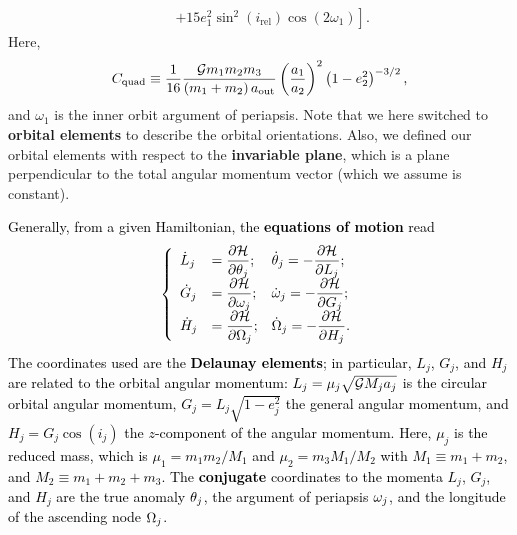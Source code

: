 \documentclass[main.tex]{subfiles}
\begin{document}
\begin{tcolorbox}[sharp corners, colback=green!30, colframe=green!80!blue, title=Box \refstepcounter{educhap3}\label{boxchap3:dynVI}\ref{boxchap3:dynVI} -- Orbital dynamics VI]
{\begin{align}
&\quad \left. + 15 e_1^2 \sin^2(i_\mathrm{rel}) \cos(2\omega_1) \right ].
\end{align} 
Here, 
\begin{align}
C_\mathrm{quad} \equiv \frac{1}{16} \frac{\mathcal{G} m_1m_2m_3}{(m_1+m_2) \, a_\mathrm{out}} \left (\frac{a_1}{a_2} \right )^2 \left (1 - e_2^2 \right )^{-3/2},
\end{align}
and $\omega_1$ is the inner orbit argument of periapsis. Note that we here switched to {\bf orbital elements} to describe the orbital orientations. Also, we defined our orbital elements with respect to the {\bf invariable plane}, which is a plane perpendicular to the total angular momentum vector (which we assume is constant).
}  
\end{tcolorbox}

\begin{tcolorbox}[sharp corners, colback=green!30, colframe=green!80!blue, title=Box \ref{boxchap3:dynVI} -- Orbital dynamics VI (continued)]
\par \textcolor{black}{
Generally, from a given Hamiltonian, the {\bf equations of motion} read
\begin{align}
\label{eq:Hameq}
\left \{ \begin{array}{lll}
\displaystyle \dot{L}_j &= \displaystyle \frac{\partial \mathcal{H}}{\partial \theta_j}; & \dot{\theta}_j = \displaystyle - \frac{\partial \mathcal{H}}{\partial L_j}; \\
\displaystyle \dot{G}_j &= \displaystyle \frac{\partial \mathcal{H}}{\partial \omega_j}; & \dot{\omega}_j = \displaystyle - \frac{\partial \mathcal{H}}{\partial G_j}; \\
\displaystyle \dot{H}_j &= \displaystyle \frac{\partial \mathcal{H}}{\partial \Omega_j}; & \dot{\Omega}_j = \displaystyle - \frac{\partial \mathcal{H}}{\partial H_j}. \\
\end{array} \right.
\end{align}
The coordinates used are the {\bf Delaunay elements}; in particular, $L_j$, $G_j$, and $H_j$ are related to the orbital angular momentum: $L_j = \mu_j \sqrt{\mathcal{G} M_j a_j}$ is the circular orbital angular momentum, $G_j = L_j \sqrt{1-e_j^2}$ the general angular momentum, and $H_j = G_j \cos (i_j)$ the $z$-component of the angular momentum. Here, $\mu_j$ is the reduced mass, which is $\mu_1 = m_1m_2/M_1$ and $\mu_2 = m_3 M_1/M_2$ with $M_1 \equiv m_1+m_2$, and $M_2 \equiv m_1+m_2+m_3$. The {\bf conjugate} coordinates to the momenta $L_j$, $G_j$, and $H_j$ are the true anomaly $\theta_j$, the argument of periapsis $\omega_j$, and the longitude of the ascending node $\Omega_j$. \\ \\
}
\end{tcolorbox}
\end{document}
